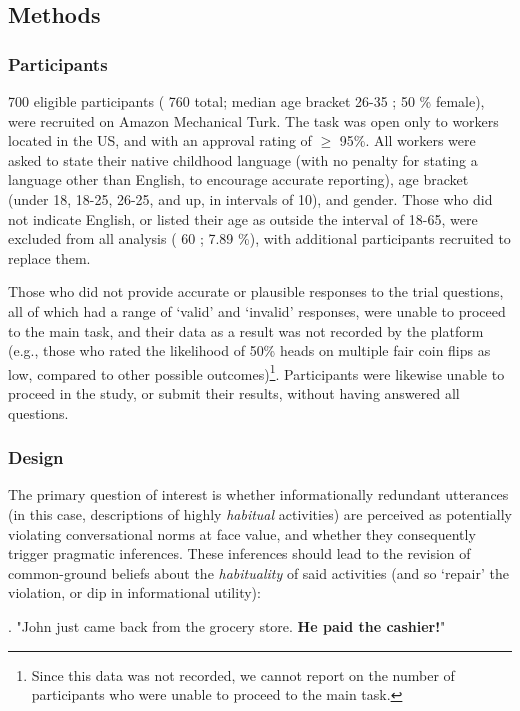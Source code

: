 \documentclass{sp}\usepackage[]{graphicx}\usepackage[]{color}
\begin{document}
\subsection{Methods}

\subsubsection{Participants}

700 eligible participants (%
760
 total; median age bracket %
26-35
; %
50
\% female), were recruited on Amazon Mechanical Turk. The task was open only to workers located in the US, and with an approval rating of $\geq$ 95\%. All workers were asked to state their native childhood language (with no penalty for stating a language other than English, to encourage accurate reporting), age bracket (under 18, 18-25, 26-25, and up, in intervals of 10), and gender.  Those who did not indicate English, or listed their age as outside the interval of 18-65, were excluded from all analysis (%
60
; %
7.89
\%), with additional participants recruited to replace them.

Those who did not provide accurate or plausible responses to the trial questions, all of which had a range of `valid' and `invalid' responses, were unable to proceed to the main task, and their data as a result was not recorded by the platform (e.g., those who rated the likelihood of 50\% heads on multiple fair coin flips as low, compared to other possible outcomes)\footnote{Since this data was not recorded, we cannot report on the number of participants who were unable to proceed to the main task.}. Participants were likewise unable to proceed in the study, or submit their results, without having answered all questions.

\subsubsection{Design}

The primary question of interest is whether informationally redundant utterances (in this case, descriptions of highly \textit{habitual} activities) are perceived as potentially violating conversational norms at face value, and whether they consequently trigger pragmatic inferences. These inferences should lead to the revision of common-ground beliefs about the \textit{habituality} of said activities (and so `repair' the violation, or dip in informational utility): 

\ex. "John just came back from the grocery store. \textbf{He paid the cashier!}"
\end{document}
